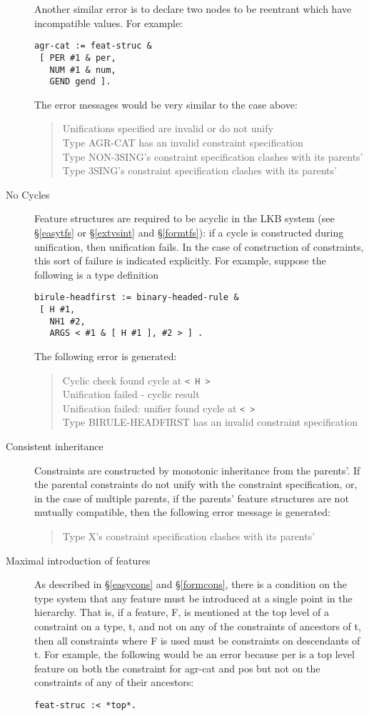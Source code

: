 \documentclass[12pt]{report}
\newenvironment{error}%
{\begin{quote}
\tt
}%
{\end{quote}
}
\begin{document}
\begin{description}
Another similar error is to declare two nodes to be reentrant which
have incompatible values.  For example:
\begin{verbatim}
agr-cat := feat-struc &
 [ PER #1 & per,
   NUM #1 & num,
   GEND gend ].
\end{verbatim}
The error messages would be very similar to the case above:
\begin{error}
Unifications specified are invalid or do not unify\\
Type AGR-CAT has an invalid constraint specification\\
Type NON-3SING's constraint specification clashes with its parents'\\
Type 3SING's constraint specification clashes with its parents'
\end{error}
\item[No Cycles] 
Feature structures are required to be acyclic
in the LKB system (see \S\ref{easytfs} or \S\ref{extvsint} and
\S\ref{formtfs}): if a cycle is constructed
during unification, then unification fails.  In the case
of construction of constraints, this sort of 
failure is indicated explicitly.
For example, suppose the following is a type definition
\begin{verbatim}
birule-headfirst := binary-headed-rule &
 [ H #1,
   NH1 #2,
   ARGS < #1 & [ H #1 ], #2 > ] .
\end{verbatim}
The following error is generated:
\begin{error}
Cyclic check found cycle at \verb+< H >+\\
Unification failed - cyclic result\\
Unification failed: unifier found cycle at \verb+< >+\\
Type BIRULE-HEADFIRST has an invalid constraint specification
\end{error}
\item[Consistent inheritance]
Constraints are constructed by monotonic inheritance from 
the parents'.  If the parental constraints do not unify with
the constraint specification, or, in the case of multiple parents,
if the parents' feature structures are not mutually compatible,
then the following error message is generated:
\begin{error}
Type X's constraint specification clashes with its parents'
\end{error}
\item[Maximal introduction of features]
As described in \S\ref{easycons} and \S\ref{formcons},
there is a condition on the type system that any feature
must be introduced at a single point in the hierarchy.
That is, if a feature, F, is mentioned at the top level of
a constraint on a type, t, and 
not on any of the constraints of
ancestors of t, then all constraints where
F is used must be constraints on descendants of t.
For example, the following would be an error because {\feature per}
is a top level feature on both the constraint for
{\type agr-cat} and {\type pos} but not on the constraints
of any of their ancestors:
\begin{verbatim}
feat-struc :< *top*.


\end{verbatim}
\end{description}
\end{document}
